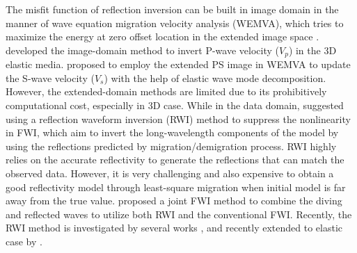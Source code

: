 The misfit function of reflection inversion can be built in image domain in the manner of wave equation migration
velocity analysis (WEMVA), which tries to maximize the
energy at zero offset location in the extended image space
\cite[]{Symes2008,Almomin2012,SunEtAl2012,biondi2013}.
\cite{RaknesEtAl2016} 
developed the image-domain method to invert P-wave velocity ($V_p$) in the 3D elastic media. 
\cite{Wang2017WEMVA} proposed to employ the extended PS image in WEMVA to update the
S-wave velocity ($V_s$) with the help of elastic wave mode decomposition.
However, the extended-domain methods are limited due to its prohibitively computational cost,
especially in 3D case.
While in the data domain,
\cite{xu:2012} suggested using a reflection waveform inversion (RWI) method to suppress the
nonlinearity in FWI, 
which aim to invert the long-wavelength components of the model by using the reflections 
predicted by migration/demigration process.
RWI highly relies on the accurate reflectivity to generate the reflections that can match the
observed data. However, it is very challenging and also expensive to obtain a good reflectivity model through 
least-square migration when initial model is far away from the true value.
\cite{Zhou2015} proposed a joint FWI method to combine the diving and reflected waves to
utilize both RWI and the conventional FWI.
Recently, the RWI method is investigated
by several works \cite[]{Wu2015b,Zhou2015}, and recently extended to elastic case by
\cite{Guo2016}.

